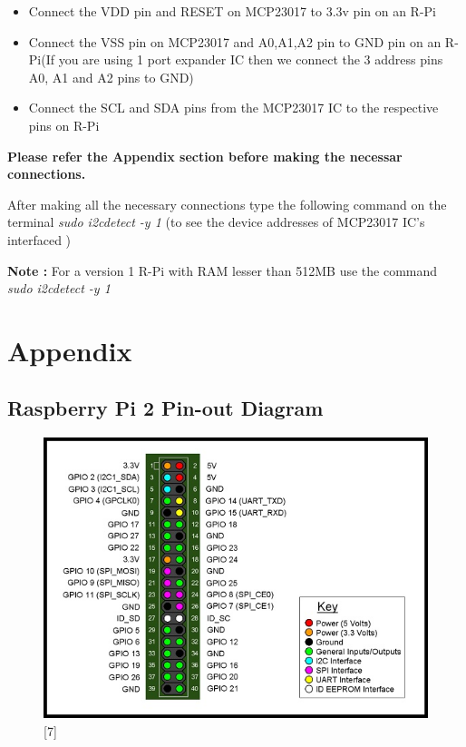 \documentclass[11pt,a4paper]{article}
\begin{document}
	\begin{itemize}
		\item Connect the VDD pin and RESET on MCP23017 to 3.3v pin on an R-Pi 
		\item Connect the VSS pin on MCP23017 and A0,A1,A2 pin to GND pin on an R-Pi(If you are using 1 port expander IC then we connect the 3 address pins A0, A1 and A2 pins to GND)
        \item Connect the SCL and SDA pins from the MCP23017 IC to the respective pins on R-Pi
	\end{itemize}
	
	\vspace{0.3cm}
	\textbf{Please refer the Appendix section before making the necessar connections. }
	
	\vspace{0.3cm}
	After making all the necessary connections type the following command on the terminal \textit{sudo i2cdetect -y 1} (to see the device addresses of MCP23017 IC's interfaced )
		
	\vspace{0.3cm}
	\textbf{Note :} For a version 1 R-Pi with RAM lesser than 512MB use the command \textit{sudo i2cdetect -y 1} 
	
	\newpage

	\section{Appendix}
	\subsection{Raspberry Pi 2 Pin-out Diagram}
	\begin{figure}[h!]
		\includegraphics[scale=0.6]{RaspberryPi2_pinout.jpg}
		\centering
		\caption{[7]}
	\end{figure}
	
\end{document}

